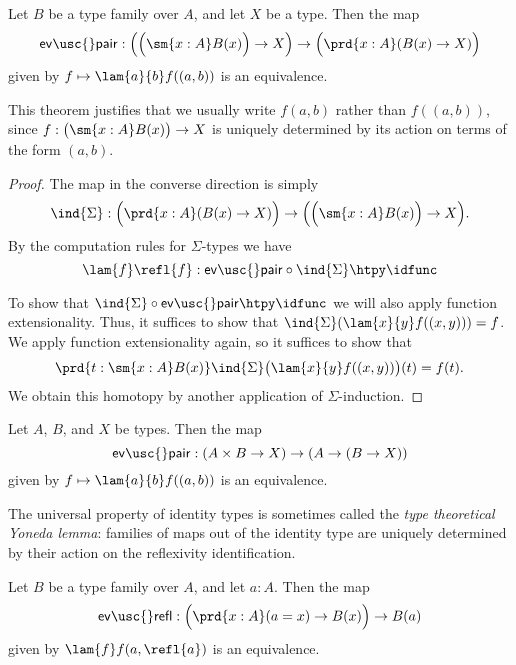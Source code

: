\begin{thm}
Let $B$ be a type family over $A$, and let $X$ be a type. Then the map
\begin{equation*}
\mathsf{ev\usc{}pair}:\Big(\Big(\sm{x:A}B(x)\Big)\to X\Big)\to \Big(\prd{x:A}(B(x)\to X)\Big)
\end{equation*}
given by $f\mapsto\lam{a}{b}f((a,b))$ is an equivalence.
\end{thm}

This theorem justifies that we usually write $f(a,b)$ rather than $f((a,b))$, since $f:\big(\sm{x:A}B(x)\big)\to X$ is uniquely determined by its action on terms of the form $(a,b)$.

\begin{proof}
The map in the converse direction is simply
\begin{equation*}
\ind{\Sigma} : \Big(\prd{x:A}(B(x)\to X)\Big)\to \Big(\Big(\sm{x:A}B(x)\Big)\to X\Big).
\end{equation*}
By the computation rules for $\Sigma$-types we have
\begin{equation*}
\lam{f}\refl{f}:\mathsf{ev\usc{}pair}\circ\ind{\Sigma}\htpy\idfunc
\end{equation*}

To show that $\ind{\Sigma}\circ\mathsf{ev\usc{}pair}\htpy\idfunc$ we will also apply function extensionality. Thus, it suffices to show that $\ind{\Sigma}(\lam{x}{y}f((x,y)))=f$. We apply function extensionality again, so it suffices to show that
\begin{equation*}
\prd{t:\sm{x:A}B(x)}\ind{\Sigma}\big(\lam{x}{y}f((x,y))\big)(t)=f(t).
\end{equation*}
We obtain this homotopy by another application of $\Sigma$-induction. 
\end{proof}

\begin{cor}
Let $A$, $B$, and $X$ be types. Then the map
\begin{equation*}
\mathsf{ev\usc{}pair}: (A\times B \to X)\to (A\to (B\to X))
\end{equation*}
given by $f\mapsto\lam{a}{b}f((a,b))$ is an equivalence.
\end{cor}

The universal property of identity types is sometimes called the \emph{type theoretical Yoneda lemma}: families of maps out of the identity type are uniquely determined by their action on the reflexivity identification.

\begin{thm}\label{thm:yoneda}
Let $B$ be a type family over $A$, and let $a:A$. Then the map
\begin{equation*}
\mathsf{ev\usc{}refl}:\Big(\prd{x:A} (a=x)\to B(x)\Big)\to B(a)
\end{equation*}
given by $\lam{f} f(a,\refl{a})$ is an equivalence. 
\end{thm}

